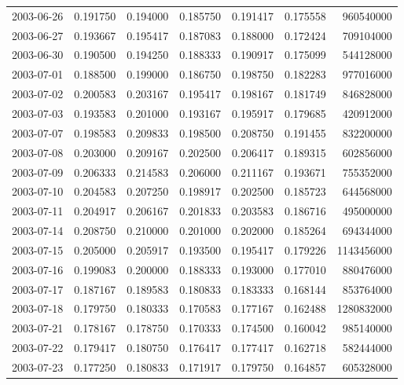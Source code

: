 \begin{tabular}{lrrrrrr}
2003-06-26 &    0.191750 &    0.194000 &    0.185750 &    0.191417 &    0.175558 &   960540000 \\
2003-06-27 &    0.193667 &    0.195417 &    0.187083 &    0.188000 &    0.172424 &   709104000 \\
2003-06-30 &    0.190500 &    0.194250 &    0.188333 &    0.190917 &    0.175099 &   544128000 \\
2003-07-01 &    0.188500 &    0.199000 &    0.186750 &    0.198750 &    0.182283 &   977016000 \\
2003-07-02 &    0.200583 &    0.203167 &    0.195417 &    0.198167 &    0.181749 &   846828000 \\
2003-07-03 &    0.193583 &    0.201000 &    0.193167 &    0.195917 &    0.179685 &   420912000 \\
2003-07-07 &    0.198583 &    0.209833 &    0.198500 &    0.208750 &    0.191455 &   832200000 \\
2003-07-08 &    0.203000 &    0.209167 &    0.202500 &    0.206417 &    0.189315 &   602856000 \\
2003-07-09 &    0.206333 &    0.214583 &    0.206000 &    0.211167 &    0.193671 &   755352000 \\
2003-07-10 &    0.204583 &    0.207250 &    0.198917 &    0.202500 &    0.185723 &   644568000 \\
2003-07-11 &    0.204917 &    0.206167 &    0.201833 &    0.203583 &    0.186716 &   495000000 \\
2003-07-14 &    0.208750 &    0.210000 &    0.201000 &    0.202000 &    0.185264 &   694344000 \\
2003-07-15 &    0.205000 &    0.205917 &    0.193500 &    0.195417 &    0.179226 &  1143456000 \\
2003-07-16 &    0.199083 &    0.200000 &    0.188333 &    0.193000 &    0.177010 &   880476000 \\
2003-07-17 &    0.187167 &    0.189583 &    0.180833 &    0.183333 &    0.168144 &   853764000 \\
2003-07-18 &    0.179750 &    0.180333 &    0.170583 &    0.177167 &    0.162488 &  1280832000 \\
2003-07-21 &    0.178167 &    0.178750 &    0.170333 &    0.174500 &    0.160042 &   985140000 \\
2003-07-22 &    0.179417 &    0.180750 &    0.176417 &    0.177417 &    0.162718 &   582444000 \\
2003-07-23 &    0.177250 &    0.180833 &    0.171917 &    0.179750 &    0.164857 &   605328000 \\

\end{tabular}
